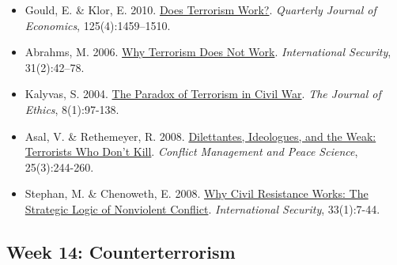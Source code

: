 \documentclass[12pt,]{article}
\providecommand{\tightlist}{%
  \setlength{\itemsep}{0pt}\setlength{\parskip}{0pt}}
\begin{document}
\begin{itemize}
\tightlist
\item
  Gould, E. \& Klor, E. 2010.
  \href{https://www.jstor.org/stable/40961012}{Does Terrorism Work?}.
  \emph{Quarterly Journal of Economics}, 125(4):1459--1510.
\item
  Abrahms, M. 2006.
  \href{https://www.mitpressjournals.org/doi/pdf/10.1162/isec.2006.31.2.42}{Why
  Terrorism Does Not Work}. \emph{International Security}, 31(2):42--78.
\item
  Kalyvas, S. 2004.
  \href{https://link.springer.com/article/10.1023/B:JOET.0000012254.69088.41}{The
  Paradox of Terrorism in Civil War}. \emph{The Journal of Ethics},
  8(1):97-138.
\item
  Asal, V. \& Rethemeyer, R. 2008.
  \href{http://journals.sagepub.com/doi/abs/10.1080/07388940802219000}{Dilettantes,
  Ideologues, and the Weak: Terrorists Who Don't Kill}. \emph{Conflict
  Management and Peace Science}, 25(3):244-260.
\item
  Stephan, M. \& Chenoweth, E. 2008.
  \href{https://www.mitpressjournals.org/doi/abs/10.1162/isec.2008.33.1.7}{Why
  Civil Resistance Works: The Strategic Logic of Nonviolent Conflict}.
  \emph{International Security}, 33(1):7-44.
\end{itemize}

\hypertarget{week-14-counterterrorism}{%
\subsection{Week 14: Counterterrorism}\label{week-14-counterterrorism}}
\end{document}
